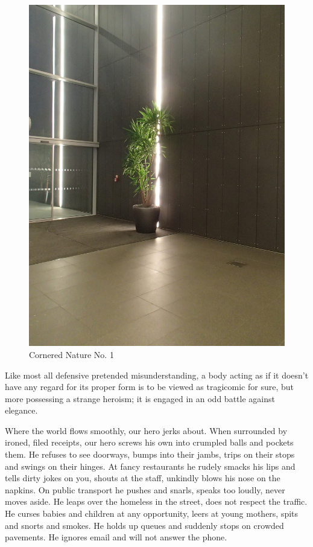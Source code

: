 \documentclass{book}
\begin{document}
\begin{figure}
\centering
\includegraphics[width=\textwidth,angle=-90]{figures/P1050156.JPG}
\caption{Cornered Nature No. 1}
\end{figure}

Like most all defensive pretended misunderstanding, a body acting as if it
doesn't have any regard for its proper form is to be viewed as tragicomic for
sure, but more possessing a strange heroism; it is engaged in an odd battle
against elegance.

Where the world flows smoothly, our hero jerks about. When surrounded by
ironed, filed receipts, our hero screws his own into crumpled balls and pockets
them. He refuses to see doorways, bumps into their jambs, trips on their stops
and swings on their hinges. At fancy restaurants he rudely smacks his lips and
tells dirty jokes on you, shouts at the staff, unkindly blows his nose on the
napkins.  On public transport he pushes and snarls, speaks too loudly, never
moves aside.  He leaps over the homeless in the street, does not respect the
traffic. He curses babies and children at any opportunity, leers at young
mothers, spits and snorts and smokes. He holds up queues and suddenly stops on
crowded pavements. He ignores email and will not answer the phone.
\end{document}

